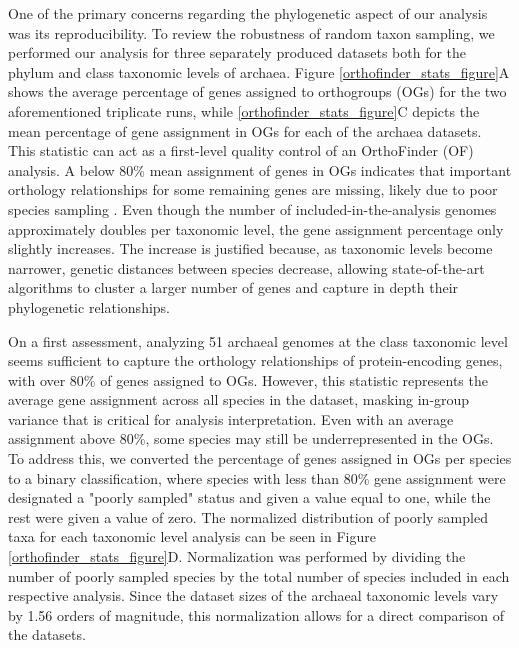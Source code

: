 One of the primary concerns regarding the phylogenetic aspect of our analysis was its reproducibility. To review the robustness of random taxon sampling, we performed our analysis for three separately produced datasets both for the phylum and class taxonomic levels of archaea. Figure \ref{orthofinder_stats_figure}A shows the average percentage of genes assigned to orthogroups (OGs) for the two aforementioned triplicate runs, while \ref{orthofinder_stats_figure}C depicts the mean percentage of gene assignment in OGs for each of the archaea datasets. This statistic can act as a first-level quality control of an OrthoFinder (OF) analysis. A below 80\% mean assignment of genes in OGs indicates that important orthology relationships for some remaining genes are missing, likely due to poor species sampling \cite{emms2015}. Even though the number of included-in-the-analysis genomes approximately doubles per taxonomic level, the gene assignment percentage only slightly increases. The increase is justified because, as taxonomic levels become narrower, genetic distances between species decrease, allowing state-of-the-art algorithms to cluster a larger number of genes and capture in depth their phylogenetic relationships.

On a first assessment, analyzing 51 archaeal genomes at the class taxonomic level seems sufficient to capture the orthology relationships of protein-encoding genes, with over 80\% of genes assigned to OGs. However, this statistic represents the average gene assignment across all species in the dataset, masking in-group variance that is critical for analysis interpretation. Even with an average assignment above 80\%, some species may still be underrepresented in the OGs. To address this, we converted the percentage of genes assigned in OGs per species to a binary classification, where species with less than 80\% gene assignment were designated a "poorly sampled" status and given a value equal to one, while the rest were given a value of zero. The normalized distribution of poorly sampled taxa for each taxonomic level analysis can be seen in Figure \ref{orthofinder_stats_figure}D. Normalization was performed by dividing the number of poorly sampled species by the total number of species included in each respective analysis. Since the dataset sizes of the archaeal taxonomic levels vary by 1.56 orders of magnitude, this normalization allows for a direct comparison of the datasets.

